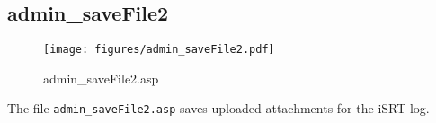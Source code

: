 \subsection{admin\_saveFile2}
\begin{figure}[htb]
    \begin{center}
        \texttt{[image: figures/admin\_saveFile2.pdf]}
    \end{center}
    \caption{admin\_saveFile2.asp}
    \label{fig:admin_saveFile2}
\end{figure}

The file \verb|admin_saveFile2.asp| saves uploaded attachments for the iSRT log.
